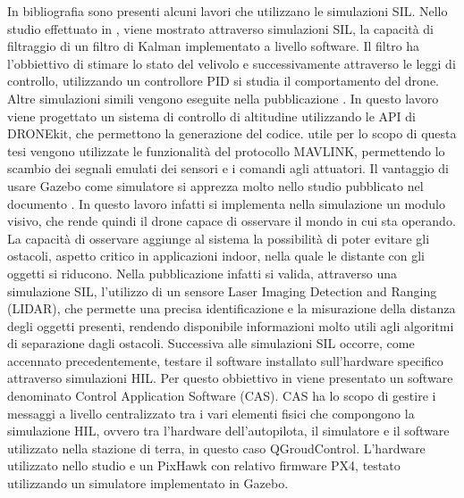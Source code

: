 In bibliografia sono presenti alcuni lavori che utilizzano le simulazioni SIL. Nello studio effettuato in \cite{SIL_perform}, viene mostrato attraverso simulazioni SIL, la capacità di filtraggio di un filtro di Kalman implementato a livello software. Il filtro ha l'obbiettivo di  stimare lo stato del velivolo e successivamente attraverso le leggi di controllo, utilizzando un controllore PID si studia il comportamento del drone. Altre simulazioni simili vengono eseguite nella pubblicazione \cite{SIL_design}. In questo lavoro viene progettato un sistema di controllo di altitudine utilizzando le API di DRONEkit, che permettono la generazione del codice. utile per lo scopo di questa tesi vengono utilizzate le funzionalità del protocollo MAVLINK, permettendo lo scambio dei segnali emulati dei sensori e i comandi agli attuatori.
Il vantaggio di usare Gazebo come simulatore si apprezza molto nello studio pubblicato nel documento \cite{Vision_base}. In questo lavoro infatti si implementa nella simulazione un modulo visivo, che rende quindi il drone capace di osservare il mondo in cui sta operando. La capacità di osservare aggiunge al sistema la possibilità di poter evitare gli ostacoli, aspetto critico in applicazioni indoor, nella quale le distante con gli oggetti si riducono. Nella pubblicazione \cite{SIL_obstacle} infatti si valida, attraverso una simulazione SIL, l'utilizzo di un sensore Laser Imaging Detection and Ranging (LIDAR), che permette una precisa identificazione e la misurazione della distanza degli oggetti presenti, rendendo disponibile informazioni molto utili agli algoritmi di separazione dagli ostacoli.
Successiva alle simulazioni SIL occorre, come accennato precedentemente, testare il software installato sull'hardware specifico attraverso simulazioni HIL. Per questo obbiettivo in \cite{HIL_Dev} viene presentato un software denominato Control Application Software (CAS). CAS ha lo scopo di gestire i messaggi a livello centralizzato tra i vari elementi fisici che compongono la simulazione HIL, ovvero tra l'hardware dell'autopilota, il simulatore e il software utilizzato nella stazione di terra, in questo caso QGroudControl. L'hardware utilizzato nello studio e un PixHawk con relativo firmware PX4, testato utilizzando un simulatore implementato in Gazebo.


